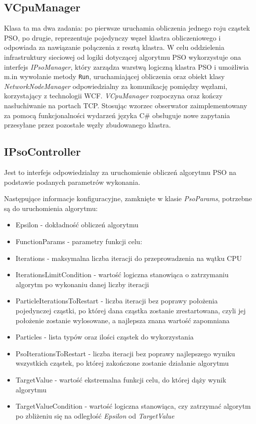 \documentclass[12pt, twoside, openany, abstract=on]{report}
\theoremstyle{definition}
\begin{document}
\subsection{VCpuManager}
Klasa ta ma dwa zadania: 
po pierwsze uruchamia obliczenia jednego roju cząstek PSO, po drugie, reprezentuje pojedynczy węzeł klastra obliczeniowego i odpowiada za nawiązanie połączenia z resztą klastra. W celu oddzielenia infrastruktury sieciowej od logiki dotyczącej algorytmu PSO wykorzystuje ona interfejs \textit{IPsoManager}, który zarządza warstwą logiczną klastra PSO i umożliwia m.in wywołanie metody \texttt{Run}, uruchamiającej obliczenia oraz obiekt klasy \textit{NetworkNodeManager} odpowiedzialny za komunikację pomiędzy węzłami, korzystający z technologii WCF. \textit{VCpuManager} rozpoczyna oraz kończy nasłuchiwanie na portach TCP. Stosując wzorzec obserwator zaimplementowany za pomocą funkcjonalności wydarzeń języka C\# obsługuje nowe zapytania przesyłane przez pozostałe węzły zbudowanego klastra.

\subsection{IPsoController}
Jest to interfejs odpowiedzialny za uruchomienie obliczeń algorytmu PSO na podstawie podanych parametrów wykonania.

Następujące informacje konfiguracyjne, zamknięte w klasie \textit{PsoParams}, potrzebne są do uruchomienia algorytmu:  

\begin{itemize}
	\item Epsilon - dokładność obliczeń algorytmu
	\item FunctionParams - parametry funkcji celu: 
	
	\item Iterations - maksymalna liczba iteracji do przeprowadzenia na wątku CPU
	\item IterationsLimitCondition - wartość logiczna stanowiąca o zatrzymaniu algorytm po wykonaniu danej liczby iteracji
	\item ParticleIterationsToRestart - liczba iteracji bez poprawy położenia pojedynczej cząstki, po której dana cząstka zostanie zrestartowana, czyli jej położenie zostanie wylosowane, a najlepsza znana wartość zapomniana
	\item Particles - lista typów oraz ilości cząstek do wykorzystania
	\item PsoIterationsToRestart - liczba iteracji bez poprawy najlepszego wyniku wszystkich cząstek, po której zakończone zostanie działanie algorytmu
	\item TargetValue - wartość ekstremalna funkcji celu, do której dąży wynik algorytmu
	\item TargetValueCondition - wartość logiczna stanowiąca, czy zatrzymać algorytm po zbliżeniu się na odległość \emph{Epsilon} od \emph{TargetValue}
\end{itemize}
\end{document}
